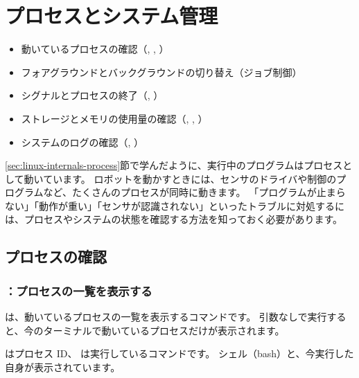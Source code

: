 \chapter{プロセスとシステム管理}
\label{chap:process}

\begin{goalbox}
  \begin{itemize}
    \item 動いているプロセスの確認（, , ）
    \item フォアグラウンドとバックグラウンドの切り替え（ジョブ制御）
    \item シグナルとプロセスの終了（, ）
    \item ストレージとメモリの使用量の確認（, , ）
    \item システムのログの確認（, ）
  \end{itemize}
\end{goalbox}

\ref{sec:linux-internals-process}節で学んだように、実行中のプログラムはプロセスとして動いています。
ロボットを動かすときには、センサのドライバや制御のプログラムなど、たくさんのプロセスが同時に動きます。
「プログラムが止まらない」「動作が重い」「センサが認識されない」といったトラブルに対処するには、プロセスやシステムの状態を確認する方法を知っておく必要があります。

\section{プロセスの確認}
\label{sec:process-check}

\subsection{：プロセスの一覧を表示する}

 は、動いているプロセスの一覧を表示するコマンドです。
引数なしで実行すると、今のターミナルで動いているプロセスだけが表示されます。


 はプロセス ID、 は実行しているコマンドです。
シェル（bash）と、今実行した  自身が表示されています。

